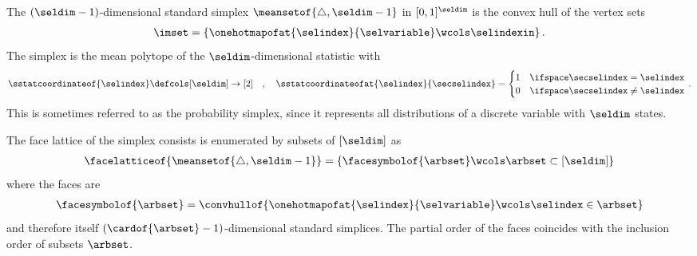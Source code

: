 \begin{example}[Simplices]
    \label{exa:simplexFaces}
    The $(\seldim-1)$-dimensional standard simplex $\meansetof{\triangle,\seldim-1}$ in $[0,1]^{\seldim}$ is the convex hull of the vertex sets
    \begin{align*}
        \imset = \{\onehotmapofat{\selindex}{\selvariable} \wcols\selindexin\} \, . %
    \end{align*}
    The simplex is the mean polytope of the $\seldim$-dimensional statistic with
    \begin{align*}
        \sstatcoordinateof{\selindex} \defcols [\seldim] \rightarrow [2] \quad, \quad
        \sstatcoordinateofat{\selindex}{\secselindex}
        = \begin{cases}
              1 & \ifspace \secselindex = \selindex \\
              0 & \ifspace \secselindex \neq \selindex
        \end{cases} \, .
    \end{align*}
    This is sometimes referred to as the probability simplex, since it represents all distributions of a discrete variable with $\seldim$ states.

    The face lattice of the simplex consists is enumerated by subsets of $[\seldim]$ as
    \begin{align*}
        \facelatticeof{\meansetof{\triangle,\seldim-1}}
        = \{\facesymbolof{\arbset}\wcols\arbset\subset[\seldim]\}
    \end{align*}
    where the faces are
    \begin{align*}
        \facesymbolof{\arbset}
        = \convhullof{\onehotmapofat{\selindex}{\selvariable} \wcols\selindex\in\arbset}
    \end{align*}
    and therefore itself $(\cardof{\arbset}-1)$-dimensional standard simplices.
    The partial order of the faces coincides with the inclusion order of subsets $\arbset$.

\end{example}